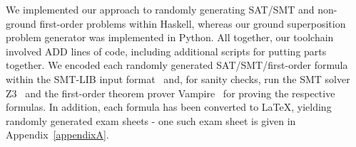 We implemented our approach  to randomly generating
SAT/SMT and non-ground first-order problems within Haskell, whereas
our ground superposition problem generator was implemented in
Python. All together, our toolchain involved ADD lines of code,
including additional scripts for putting parts together.  %
We encoded each randomly generated SAT/SMT/first-order formula within
the SMT-LIB input format~\cite{barrett2017smtlib} and, for sanity checks, run the SMT
solver Z3~\cite{Z3}  and the first-order theorem prover
Vampire~\cite{Vampire13} for proving the respective formulas.
In addition, each formula has been converted  to \LaTeX{}, yielding
randomly generated exam sheets - one such exam sheet is given in
Appendix~\ref{appendixA}. 

%
%
%
%
